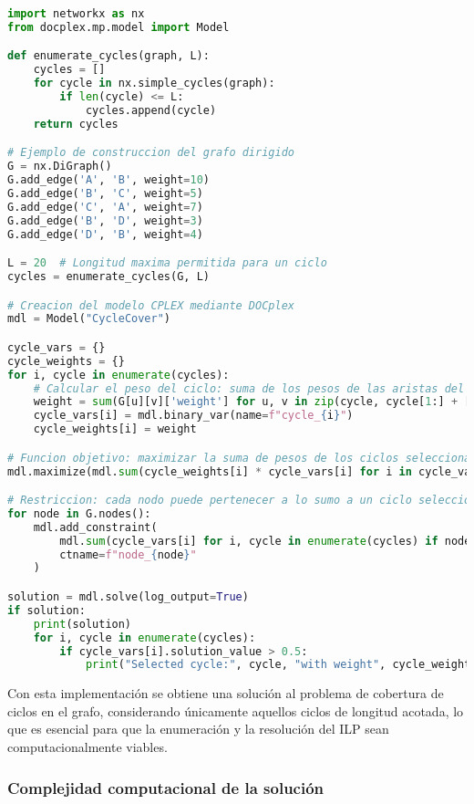 \documentclass[twocolumn, fontsize=10pt]{article}
\theoremstyle{definition} %
\begin{document}
\begin{lstlisting}[language=Python, frame=single, caption={Ejemplo de construcción del grafo dirigido}, breaklines=true]
import networkx as nx
from docplex.mp.model import Model

def enumerate_cycles(graph, L):
    cycles = []
    for cycle in nx.simple_cycles(graph):
        if len(cycle) <= L:
            cycles.append(cycle)
    return cycles

# Ejemplo de construccion del grafo dirigido
G = nx.DiGraph()
G.add_edge('A', 'B', weight=10)
G.add_edge('B', 'C', weight=5)
G.add_edge('C', 'A', weight=7)
G.add_edge('B', 'D', weight=3)
G.add_edge('D', 'B', weight=4)

L = 20  # Longitud maxima permitida para un ciclo
cycles = enumerate_cycles(G, L)

# Creacion del modelo CPLEX mediante DOCplex
mdl = Model("CycleCover")

cycle_vars = {}
cycle_weights = {}
for i, cycle in enumerate(cycles):
    # Calcular el peso del ciclo: suma de los pesos de las aristas del ciclo
    weight = sum(G[u][v]['weight'] for u, v in zip(cycle, cycle[1:] + [cycle[0]]))
    cycle_vars[i] = mdl.binary_var(name=f"cycle_{i}")
    cycle_weights[i] = weight

# Funcion objetivo: maximizar la suma de pesos de los ciclos seleccionados
mdl.maximize(mdl.sum(cycle_weights[i] * cycle_vars[i] for i in cycle_vars))

# Restriccion: cada nodo puede pertenecer a lo sumo a un ciclo seleccionado
for node in G.nodes():
    mdl.add_constraint(
        mdl.sum(cycle_vars[i] for i, cycle in enumerate(cycles) if node in cycle) <= 1,
        ctname=f"node_{node}"
    )

solution = mdl.solve(log_output=True)
if solution:
    print(solution)
    for i, cycle in enumerate(cycles):
        if cycle_vars[i].solution_value > 0.5:
            print("Selected cycle:", cycle, "with weight", cycle_weights[i])
\end{lstlisting}

Con esta implementación se obtiene una solución al problema de cobertura de ciclos en el grafo, considerando únicamente aquellos ciclos de longitud acotada, lo que es esencial para que la enumeración y la resolución del ILP sean computacionalmente viables.

\subsubsection{Complejidad computacional de la solución}
\end{document}
